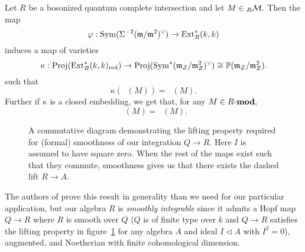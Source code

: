 \documentclass [11pt, proquest] {uwthesis}[2020/02/24]
\DeclareMathOperator{\supphR}{supp^\mathit{hyp}_R}
\DeclareMathOperator{\suppc}{supp^\mathit{coh}_R}
\begin{document}
    \begin{thm}\label{thm:np-supph-suppc}
        Let $R$ be a bosonized quantum complete intersection and let $M\in{_R\mathcal{M}}.$ Then the map
        \[\varphi:\operatorname{Sym}(\Sigma^{-2}(\mathfrak{m}/\mathfrak{m}^2)^\vee)\to \operatorname{Ext}_R^\ast(k,k)\]
        induces a map of varieties
        \[\kappa:\operatorname{Proj}(\operatorname{Ext}^\ast_R(k,k)_\text{red})\to \operatorname{Proj}(\operatorname{Sym}^\ast(\mathfrak{m}_Z/\mathfrak{m}_Z^2)^\vee)\cong\mathbb{P}(\mathfrak{m}_Z/\mathfrak{m}_Z^2).\]
        such that
        \[\kappa(\suppc(M))=\supphR(M).\]
        Further if $\kappa$ is a closed embedding, we get that, for any $M\in R\text{-}\mathbf{mod},$
        \[\suppc(M)=\supphR(M).\]
    \end{thm}
    \begin{figure}
        \centering
        \caption{A commutative diagram demonstrating the lifting property required for (formal) smoothness of our integration $Q\to R.$ Here $I$ is assumed to have square zero. When the rest of the maps exist such that they commute, smoothness gives us that there exists the dashed lift $R\to A.$}
        \label{fig:formally-smooth}
    \end{figure}
    
    The authors of \cite{negron-pevtsovaI} prove this result in generality than we need for our particular application, but our algebra $R$ is \textit{smoothly integrable} since it admits a Hopf map $Q\to R$ where $R$ is smooth over $Q$ ($Q$ is of finite type over $k$ and $Q\to R$ satisfies the lifting property in figure~\ref{fig:formally-smooth} for any algebra $A$ and ideal $I\lhd A$ with $I^2=0$), augmented, and Noetherian with finite cohomological dimension. 
    
\end{document}
